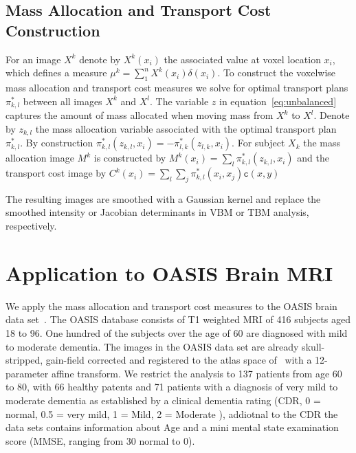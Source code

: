 \documentclass{llncs}
\newcommand{\cost}[0]{\mathtt{c}}
\newcommand{\coupling}[0]{\pi}
\begin{document}
\subsection{Mass Allocation and Transport Cost Construction}
\label{sec:mass}
For an image $X^k$ denote by $X^k(x_i)$ the associated value at voxel location
$x_i$, which defines a measure $\mu^k = \sum_1^n X^k(x_i) \delta(x_i)$.
To construct the voxelwise mass allocation and transport cost measures we solve
for optimal transport plans $\coupling^*_{k,l}$ between all images $X^k$ and $X^l$.  
The variable $z$ in equation~\ref{eq:unbalanced} captures the amount of mass
allocated when moving mass from $X^k$ to $X^l$. Denote by $z_{k, l}$ the mass
allocation variable associated with the optimal transport plan
$\coupling^*_{k,l}$.  By construction $\coupling^*_{k,l}(z_{k,l}, x_i) =
-\coupling^*_{l,k}(z_{l,k}, x_i)$.  For
subject $X_k$ the mass allocation image $M^k$ is constructed by
$M^k(x_i) = \sum_l \coupling^*_{k,l}( z_{k, l}, x_i )$ and the transport cost image by
$C^k(x_i) = \sum_l \sum_j \coupling^*_{k,l}( x_i, x_j ) \cost(x, y)$

The resulting images are smoothed with a Gaussian kernel and replace the
smoothed intensity or Jacobian determinants in VBM or TBM analysis,
respectively. 



\section{Application to OASIS Brain MRI}
We apply the mass allocation and transport cost measures to the OASIS brain
data set~\citep{marcus2010open}.  The OASIS database consists of T1 weighted
MRI of 416 subjects aged 18 to 96. One hundred of the subjects over the age of
60 are diagnosed with mild to moderate dementia. The images in the OASIS data
set are already skull-stripped, gain-field corrected and registered to the
atlas space of~\citet{talaraich:book88} with a 12-parameter affine transform.
We restrict the analysis to 137 patients from age 60 to 80, with 66 healthy
patents and 71 patients with a diagnosis of very mild to moderate dementia as
established by a clinical dementia rating (CDR, 0 = normal, 0.5 = very mild, 1
= Mild, 2 = Moderate ), addiotnal to the CDR the data sets contains information
about Age and a mini mental state examination score (MMSE, ranging from 30
normal to 0).
\end{document}
